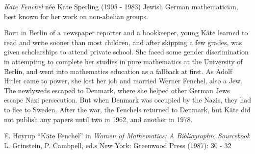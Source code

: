 \documentclass[12pt]{article}
\begin{document}
\emph{K\"ate Fenchel} n\'ee {Kate Sperling} (1905 - 1983) Jewish German mathematician, best known for her work on non-abelian groups.

Born in Berlin of a newspaper reporter and a bookkeeper, young K\"ate learned to read and write sooner than most children, and after skipping a few grades, was given scholarships to attend private school. She faced some gender discrimination in attempting to complete her studies in pure mathematics at the University of Berlin, and went into mathematics education as a fallback at first. As Adolf Hitler came to power, she lost her job and married Werner Fenchel, also a Jew. The newlyweds escaped to Denmark, where she helped other German Jews escape Nazi persecution. But when Denmark was occupied by the Nazis, they had to flee to Sweden. After the war, the Fenchels returned to Denmark, but K\"ate did not publish any papers until two in 1962, and another in 1978.

\begin{thebibliography}{1}
 E. H{\o}yrup ``K\"ate Fenchel'' in {\it Women of Mathematics: A Bibliographic Sourcebook} L. Grinstein, P. Cambpell, ed.s New York: Greenwood Press (1987): 30 - 32
\end{thebibliography}
\end{document}

